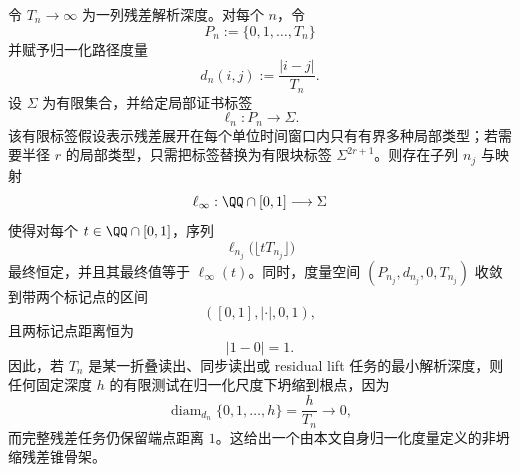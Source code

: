 \begin{theorem}[有界局部复杂度与无界残差深度的归一化锥骨架抽取]\label{distill:gromov-coarse_limit_obstruction_families-frt-normalized-residual-cone-extraction}
令 \(T_n\to\infty\) 为一列残差解析深度。对每个 \(n\)，令
\[
P_n:=\{0,1,\ldots,T_n\}
\]
并赋予归一化路径度量
\[
d_n(i,j):=\frac{|i-j|}{T_n}.
\]
设 \(\Sigma\) 为有限集合，并给定局部证书标签
\[
\ell_n:P_n\longrightarrow\Sigma.
\]
该有限标签假设表示残差展开在每个单位时间窗口内只有有界多种局部类型；若需要半径 \(r\) 的局部类型，只需把标签替换为有限块标签 \(\Sigma^{2r+1}\)。则存在子列 \(n_j\) 与映射
\[
\ell_\infty:\QQ\cap[0,1]\longrightarrow\Sigma
\]
使得对每个 \(t\in\QQ\cap[0,1]\)，序列
\[
\ell_{n_j}\bigl(\lfloor tT_{n_j}\rfloor\bigr)
\]
最终恒定，并且其最终值等于 \(\ell_\infty(t)\)。同时，度量空间 \((P_{n_j},d_{n_j},0,T_{n_j})\) 收敛到带两个标记点的区间
\[
([0,1],|\cdot|,0,1),
\]
且两标记点距离恒为
\[
|1-0|=1.
\]
因此，若 \(T_n\) 是某一折叠读出、同步读出或 residual lift 任务的最小解析深度，则任何固定深度 \(h\) 的有限测试在归一化尺度下坍缩到根点，因为
\[
\operatorname{diam}_{d_n}\{0,1,\ldots,h\}=\frac{h}{T_n}\longrightarrow0,
\]
而完整残差任务仍保留端点距离 \(1\)。这给出一个由本文自身归一化度量定义的非坍缩残差锥骨架。
\end{theorem}

